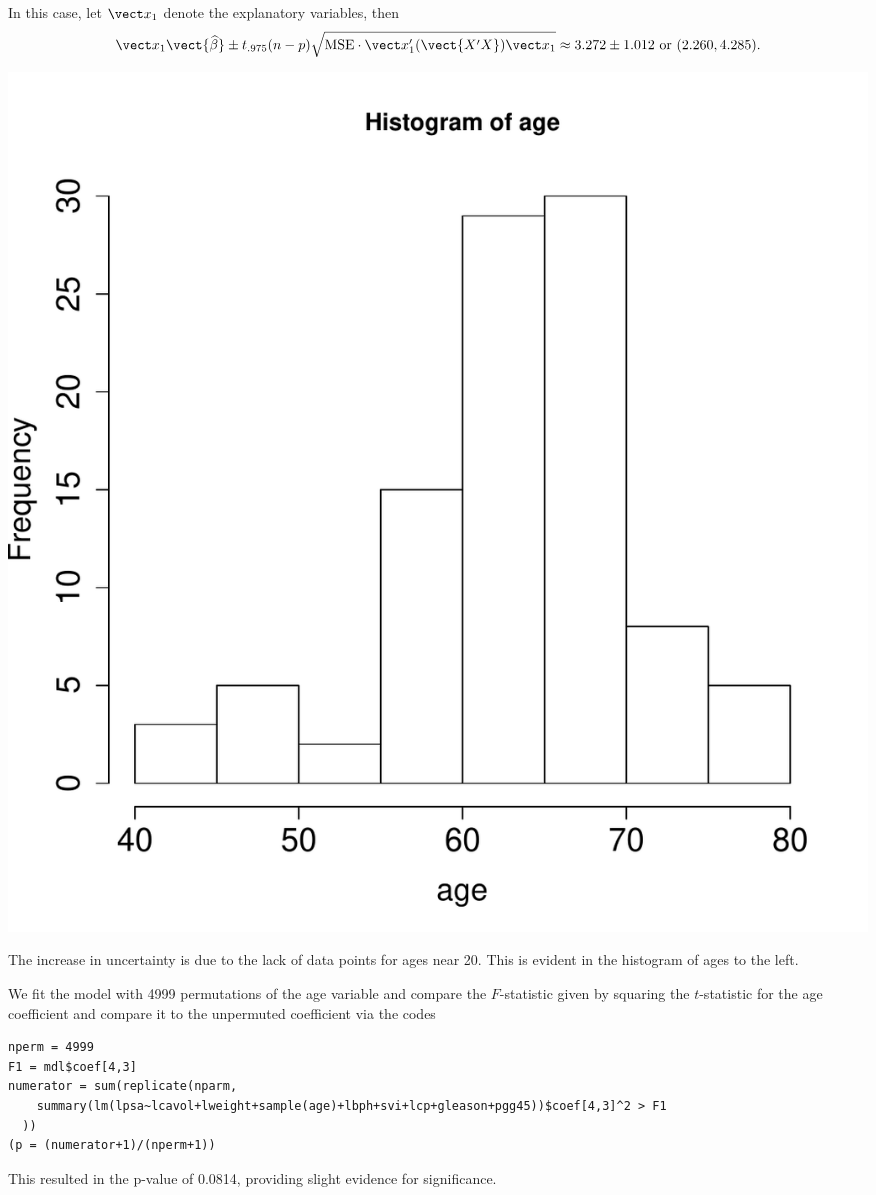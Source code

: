 \documentclass{homework}
\begin{document}

In this case, let $\vect x_1$ denote the explanatory variables, then
$$
  \vect x_1 \vect{\hat \beta} \pm t_{.975}(n-p)\sqrt{\MSE\cdot\vect x_1'(\vect{X'X})\vect x_1} \approx 3.272 \pm 1.012
\text{ or }
( 2.260, 4.285 ). $$


\begin{minipage}{.3\textwidth}
\includegraphics[width=\textwidth]{age_hist.pdf}
\end{minipage}
\begin{minipage}{.7\textwidth}
The increase in uncertainty is due to the lack of data points for ages near 20.  This is evident in the histogram of ages to the left.
\end{minipage}


We fit the model with 4999 permutations of the age variable and compare the $F$-statistic given by squaring the $t$-statistic for the age coefficient and compare it to the unpermuted coefficient via the codes
{\small
\begin{verbatim}
nperm = 4999
F1 = mdl$coef[4,3]
numerator = sum(replicate(nparm, 
    summary(lm(lpsa~lcavol+lweight+sample(age)+lbph+svi+lcp+gleason+pgg45))$coef[4,3]^2 > F1
  ))
(p = (numerator+1)/(nperm+1)) 
\end{verbatim}
}
This resulted in the p-value of 0.0814, providing slight evidence for significance.
\end{document}

